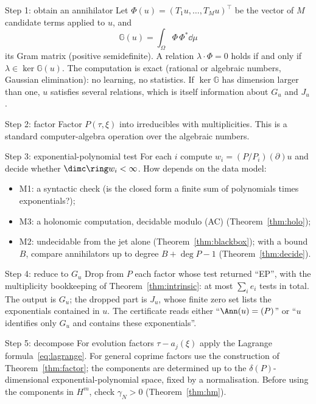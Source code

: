 \begin{aside}{Step 1: obtain an annihilator}
Let $\Phi(u)=(T_1u,\dots,T_Mu)^{\top}$ be the vector of $M$ candidate terms applied to $u$, and
\[
\mathbb G(u)=\int_\Omega\Phi\,\Phi^{*}\dd\mu
\]
its Gram matrix (positive semidefinite). A relation $\lambda\cdot\Phi=0$ holds if and only if $\lambda\in\ker\mathbb G(u)$. The computation is exact (rational or algebraic numbers, Gaussian elimination): no learning, no statistics. If $\ker\mathbb G$ has dimension larger than one, $u$ satisfies several relations, which is itself information about $G_u$ and $J_u$.
\end{aside}

\begin{aside}{Step 2: factor}
Factor $P(\tau,\xi)$ into irreducibles with multiplicities. This is a standard computer-algebra operation over the algebraic numbers.
\end{aside}

\begin{aside}{Step 3: exponential-polynomial test}
For each $i$ compute $w_i=(P/P_i)(\partial)u$ and decide whether $\dimc\ring w_i<\infty$. How depends on the data model:
\begin{itemize}
\item M1: a syntactic check (is the closed form a finite sum of polynomials times exponentials?);
\item M3: a holonomic computation, decidable modulo (AC) (Theorem~\ref{thm:holo});
\item M2: undecidable from the jet alone (Theorem~\ref{thm:blackbox}); with a bound $B$, compare annihilators up to degree $B+\deg P-1$ (Theorem~\ref{thm:decide}).
\end{itemize}
\end{aside}

\begin{aside}{Step 4: reduce to $G_u$}
Drop from $P$ each factor whose test returned ``EP'', with the multiplicity bookkeeping of Theorem~\ref{thm:intrinsic}: at most $\sum_ie_i$ tests in total. The output is $G_u$; the dropped part is $J_u$, whose finite zero set lists the exponentials contained in $u$. The certificate reads either ``$\Ann(u)=(P)$'' or ``$u$ identifies only $G_u$ and contains these exponentials''.
\end{aside}

\begin{aside}{Step 5: decompose}
For evolution factors $\tau-a_j(\xi)$ apply the Lagrange formula~\eqref{eq:lagrange}. For general coprime factors use the construction of Theorem~\ref{thm:factor}; the components are determined up to the $\delta(P)$-dimensional exponential-polynomial space, fixed by a normalisation. Before using the components in $H^m$, check $\gamma_N>0$ (Theorem~\ref{thm:hm}).
\end{aside}

